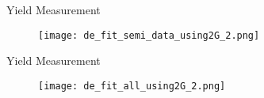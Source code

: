 \documentclass[12pt]{beamer}
\begin{document}
\begin{frame}{Yield Measurement}   
	\vspace{-1cm}                                                                        
	\begin{figure}
		\centering
		\texttt{[image: de\_fit\_semi\_data\_using2G\_2.png]}
	\end{figure}
\end{frame}

\begin{frame}{Yield Measurement}   
	\vspace{-1cm}                                                                        
	\begin{figure}[t]
		\centering
		\texttt{[image: de\_fit\_all\_using2G\_2.png]}
	\end{figure}
\end{frame}
\end{document}
